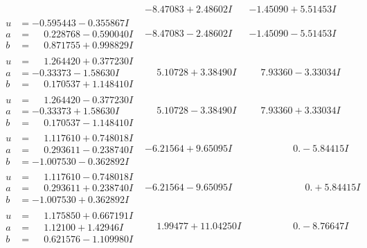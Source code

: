 \documentclass[1p]{elsarticle_modified}
\theoremstyle{definition}
\begin{document}
$$\begin{array}{c|c|c}
 & -8.47083 + 2.48602 I & -1.45090 + 5.51453 I \\ \hline\begin{aligned}
u &= -0.595443 - 0.355867 I \\
a &= \phantom{-}0.228768 - 0.590040 I \\
b &= \phantom{-}0.871755 + 0.998829 I\end{aligned}
 & -8.47083 - 2.48602 I & -1.45090 - 5.51453 I \\ \hline\begin{aligned}
u &= \phantom{-}1.264420 + 0.377230 I \\
a &= -0.33373 - 1.58630 I \\
b &= \phantom{-}0.170537 + 1.148410 I\end{aligned}
 & \phantom{-}5.10728 + 3.38490 I & \phantom{-}7.93360 - 3.33034 I \\ \hline\begin{aligned}
u &= \phantom{-}1.264420 - 0.377230 I \\
a &= -0.33373 + 1.58630 I \\
b &= \phantom{-}0.170537 - 1.148410 I\end{aligned}
 & \phantom{-}5.10728 - 3.38490 I & \phantom{-}7.93360 + 3.33034 I \\ \hline\begin{aligned}
u &= \phantom{-}1.117610 + 0.748018 I \\
a &= \phantom{-}0.293611 - 0.238740 I \\
b &= -1.007530 - 0.362892 I\end{aligned}
 & -6.21564 + 9.65095 I & \phantom{-0.000000 } 0. - 5.84415 I \\ \hline\begin{aligned}
u &= \phantom{-}1.117610 - 0.748018 I \\
a &= \phantom{-}0.293611 + 0.238740 I \\
b &= -1.007530 + 0.362892 I\end{aligned}
 & -6.21564 - 9.65095 I & \phantom{-0.000000 -}0. + 5.84415 I \\ \hline\begin{aligned}
u &= \phantom{-}1.175850 + 0.667191 I \\
a &= \phantom{-}1.12100 + 1.42946 I \\
b &= \phantom{-}0.621576 - 1.109980 I\end{aligned}
 & \phantom{-}1.99477 + 11.04250 I & \phantom{-0.000000 } 0. - 8.76647 I \\ \hline\begin{aligned}

\end{aligned}
\end{array}$$
\end{document}

